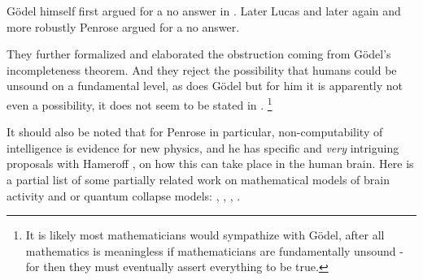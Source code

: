 \documentclass[9pt,twocolumn,twoside,lineno]{pnas-new}
\numberwithin{equation}{section}
\theoremstyle{definition}
\theoremstyle{remark}
\begin{document}

G\"odel himself first argued for a no answer in \cite[310]{citeGodel}.
Later Lucas \cite{citeLucas}  and later again and more robustly Penrose \cite{citePenroseEmperor} argued for a no answer.

They further formalized and elaborated the obstruction coming from G\"odel's incompleteness theorem. And they reject the possibility that humans could be unsound on a fundamental level, as does G\"odel but for him it is apparently not even a possibility, it does not  seem to be stated in \cite{citeGodel}. \footnote {It is likely most mathematicians would sympathize with G\"odel, after all mathematics is meaningless if mathematicians are fundamentally unsound - for then they must eventually assert everything to be true.} %
 


It should also be noted that for Penrose in particular, non-computability of intelligence is evidence for new physics, and he has specific and \emph{very} intriguing proposals with Hameroff \cite{citeHAMEROFF201439}, on how this can take place in the human brain.  Here is a partial list of some partially related work on mathematical models of brain activity and or quantum collapse models: \cite{cite:Quanta}, \cite{citeKremnizer2015}, \cite{citeHoffmanAgents}, \cite{cite:GrindfordConsciousnessPerspective}.
\end{document}
